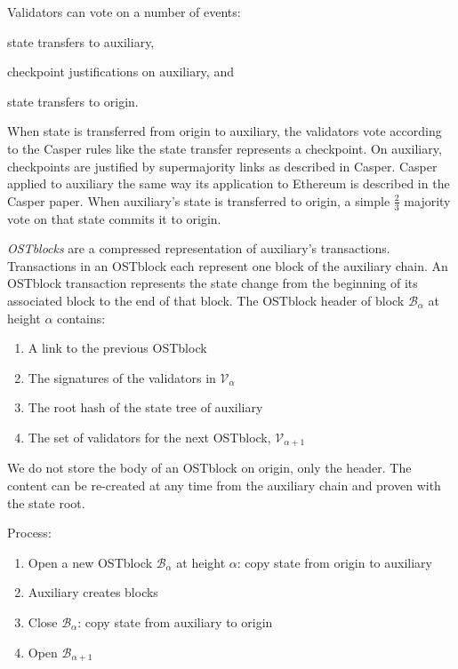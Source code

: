 \documentclass[12pt,a4paper]{article}
\newcommand{\V}{\mathcal{V}}
\newcommand{\B}{\mathcal{B}}
\begin{document}
Validators can vote on a number of events:
\begin{inparaenum}[(a)]
	\item state transfers to auxiliary,
	\item checkpoint justifications on auxiliary, and
 	\item state transfers to origin.
\end{inparaenum}
When state is transferred from origin to auxiliary,
the validators vote according to the Casper rules like the state transfer represents a checkpoint.
On auxiliary, checkpoints are justified by supermajority links as described in Casper.
Casper applied to auxiliary the same way its application to Ethereum is described in the Casper paper.
When auxiliary's state is transferred to origin, a simple $\frac{2}{3}$ majority vote on that state commits it to origin.

\emph{OSTblocks} are a compressed representation of auxiliary's transactions.
Transactions in an OSTblock each represent one block of the auxiliary chain.
An OSTblock transaction represents the state change from the beginning of its associated block to the end of that block.
The OSTblock header of block $\B_\alpha$ at height $\alpha$ contains:
\begin{enumerate}
	\item A link to the previous OSTblock
	\item The signatures of the validators in $\V_\alpha$
	\item The root hash of the state tree of auxiliary
	\item The set of validators for the next OSTblock, $\V_{\alpha+1}$
\end{enumerate}
We do not store the body of an OSTblock on origin, only the header.
The content can be re-created at any time from the auxiliary chain and proven with the state root.

Process:
\begin{enumerate}
	\item Open a new OSTblock $\B_\alpha$ at height $\alpha$: copy state from origin to auxiliary
	\item Auxiliary creates blocks
	\item Close $\B_\alpha$: copy state from auxiliary to origin
	\item Open $\B_{\alpha+1}$
\end{enumerate}
\end{document}
